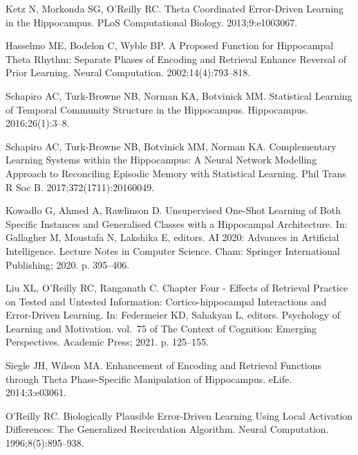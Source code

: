 \documentclass[10pt,letterpaper]{article}
\begin{document}
\begin{thebibliography}{10}
  Ketz N, Morkonda SG, O'Reilly RC.
  \newblock Theta Coordinated Error-Driven Learning in the Hippocampus.
  \newblock PLoS Computational Biology. 2013;9:e1003067.
  
  Hasselmo ME, Bodelon C, Wyble BP.
  \newblock A Proposed Function for Hippocampal Theta Rhythm: Separate Phases of
    Encoding and Retrieval Enhance Reversal of Prior Learning.
  \newblock Neural Computation. 2002;14(4):793--818.
  
  Schapiro AC, {Turk-Browne} NB, Norman KA, Botvinick MM.
  \newblock Statistical Learning of Temporal Community Structure in the
    Hippocampus.
  \newblock Hippocampus. 2016;26(1):3--8.
  
  Schapiro AC, {Turk-Browne} NB, Botvinick MM, Norman KA.
  \newblock Complementary Learning Systems within the Hippocampus: A Neural
    Network Modelling Approach to Reconciling Episodic Memory with Statistical
    Learning.
  \newblock Phil Trans R Soc B. 2017;372(1711):20160049.
  
  Kowadlo G, Ahmed A, Rawlinson D.
  \newblock Unsupervised {{One-Shot Learning}} of {{Both Specific Instances}} and
    {{Generalised Classes}} with a {{Hippocampal Architecture}}.
  \newblock In: Gallagher M, Moustafa N, Lakshika E, editors. {{AI}} 2020:
    {{Advances}} in {{Artificial Intelligence}}. Lecture {{Notes}} in {{Computer
    Science}}. {Cham}: {Springer International Publishing}; 2020. p. 395--406.
  
  Liu XL, O'Reilly RC, Ranganath C.
  \newblock Chapter {{Four}} - {{Effects}} of Retrieval Practice on Tested and
    Untested Information: {{Cortico-hippocampal}} Interactions and Error-Driven
    Learning.
  \newblock In: Federmeier KD, Sahakyan L, editors. Psychology of {{Learning}}
    and {{Motivation}}. vol.~75 of The {{Context}} of {{Cognition}}: {{Emerging
    Perspectives}}. {Academic Press}; 2021. p. 125--155.
  
  Siegle JH, Wilson MA.
  \newblock Enhancement of Encoding and Retrieval Functions through Theta
    Phase-Specific Manipulation of Hippocampus.
  \newblock eLife. 2014;3:e03061.
  
  O'Reilly RC.
  \newblock Biologically Plausible Error-Driven Learning Using Local Activation
    Differences: {{The}} Generalized Recirculation Algorithm.
  \newblock Neural Computation. 1996;8(5):895--938.
  

\end{thebibliography}
\end{document}
